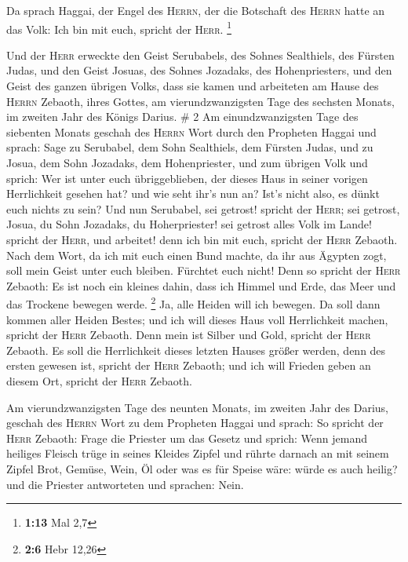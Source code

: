  Da sprach Haggai, der Engel des \textsc{Herrn}, der die
Botschaft des \textsc{Herrn} hatte an das Volk: Ich bin mit euch,
spricht der \textsc{Herr}. \footnote{\textbf{1:13} Mal 2,7}

 Und der \textsc{Herr} erweckte den Geist Serubabels, des
Sohnes Sealthiels, des Fürsten Judas, und den Geist Josuas, des Sohnes
Jozadaks, des Hohenpriesters, und den Geist des ganzen übrigen Volks,
dass sie kamen und arbeiteten am Hause des \textsc{Herrn} Zebaoth, ihres
Gottes,  am vierundzwanzigsten Tage des sechsten Monats,
im zweiten Jahr des Königs Darius. \# 2  Am
einundzwanzigsten Tage des siebenten Monats geschah des \textsc{Herrn}
Wort durch den Propheten Haggai und sprach:  Sage zu
Serubabel, dem Sohn Sealthiels, dem Fürsten Judas, und zu Josua, dem
Sohn Jozadaks, dem Hohenpriester, und zum übrigen Volk und sprich:
 Wer ist unter euch übriggeblieben, der dieses Haus in
seiner vorigen Herrlichkeit gesehen hat? und wie seht ihr's nun an?
Ist's nicht also, es dünkt euch nichts zu sein?  Und nun
Serubabel, sei getrost! spricht der \textsc{Herr}; sei getrost, Josua,
du Sohn Jozadaks, du Hoherpriester! sei getrost alles Volk im Lande!
spricht der \textsc{Herr}, und arbeitet! denn ich bin mit euch, spricht
der \textsc{Herr} Zebaoth.  Nach dem Wort, da ich mit euch
einen Bund machte, da ihr aus Ägypten zogt, soll mein Geist unter euch
bleiben. Fürchtet euch nicht!  Denn so spricht der
\textsc{Herr} Zebaoth: Es ist noch ein kleines dahin, dass ich Himmel
und Erde, das Meer und das Trockene bewegen werde. \footnote{\textbf{2:6}
  Hebr 12,26}  Ja, alle Heiden will ich bewegen. Da soll
dann kommen aller Heiden Bestes; und ich will dieses Haus voll
Herrlichkeit machen, spricht der \textsc{Herr} Zebaoth. 
Denn mein ist Silber und Gold, spricht der \textsc{Herr} Zebaoth.
 Es soll die Herrlichkeit dieses letzten Hauses größer
werden, denn des ersten gewesen ist, spricht der \textsc{Herr} Zebaoth;
und ich will Frieden geben an diesem Ort, spricht der \textsc{Herr}
Zebaoth.

 Am vierundzwanzigsten Tage des neunten Monats, im
zweiten Jahr des Darius, geschah des \textsc{Herrn} Wort zu dem
Propheten Haggai und sprach:  So spricht der
\textsc{Herr} Zebaoth: Frage die Priester um das Gesetz und sprich:
 Wenn jemand heiliges Fleisch trüge in seines Kleides
Zipfel und rührte darnach an mit seinem Zipfel Brot, Gemüse, Wein, Öl
oder was es für Speise wäre: würde es auch heilig? und die Priester
antworteten und sprachen: Nein.

